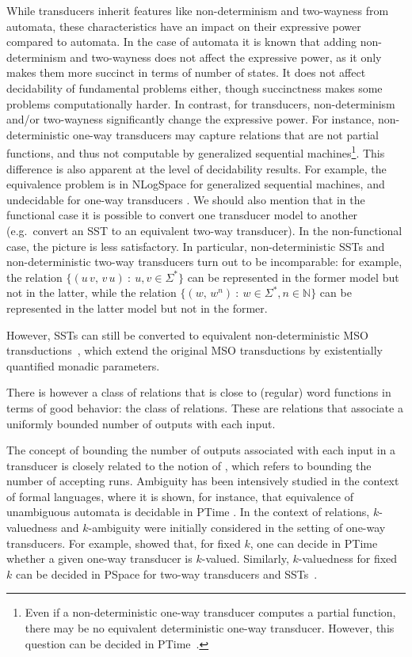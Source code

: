 \documentclass{article}
\providecommand{\AP}{}\NewDocumentCommand{\reintro}{o m}{#2}
\begin{document}
While transducers inherit features like
non-determinism and two-wayness from automata,
these characteristics have an
impact on their expressive power compared to automata. 
In the case of automata it is known that adding non-determinism and 
two-wayness does not affect the expressive power,
as it only makes them more succinct in terms of number of states.
It does not affect decidability of fundamental problems either,
though succinctness makes some problems 
computationally harder. 
In contrast, for transducers, non-determinism 
and/or two-wayness
significantly  change the expressive power.
For instance, non-deterministic one-way transducers may capture 
relations that are not partial functions,
and thus not computable by generalized sequential machines\footnote{Even if a
non-deterministic one-way transducer computes a partial function, there may be
no equivalent deterministic one-way transducer. However, this question can be decided in {\upshape\sc PTime}~\cite{BealC02,AllauzenM03}.}.
This difference is also apparent at the level of decidability results. 
For example, the equivalence problem is in {\upshape\sc NLogSpace}
for generalized sequential machines,
and undecidable for one-way transducers \cite{FischerR68,iba78siam,many_facets}.
We should also mention that in the functional case it is 
possible to convert one transducer model to another
(e.g.~convert an SST to an equivalent two-way transducer).
In the non-functional case, the picture is less satisfactory.
In particular, non-deterministic SSTs and non-deterministic 
two-way transducers turn out to be incomparable:
for example, the relation
$\{(u\,v, \, v\,u) \::\: u,v\in\Sigma^*\}$ can be represented 
in the former model but not in the latter, while the relation
$\{(w, \, w^n) \::\: w\in\Sigma^*, n\in\mathbb{N}\}$ can be
represented in the latter model but not in the former.
\AP
However, SSTs can still be converted to equivalent
non-deterministic MSO transductions~\cite{DBLP:conf/icalp/AlurD11}, 
which extend the original MSO transductions 
by existentially quantified monadic parameters.


\AP
There is however a class of relations that is close
to (regular) word functions in terms of good behavior: 
the class of  relations.
These are relations that associate a uniformly bounded
number of outputs with each input.
\AP
The concept of bounding the number of outputs associated 
with each input in a transducer is closely related to 
the notion of  , which refers to bounding the number of accepting runs.
 Ambiguity has been intensively studied 
in the context of formal languages, where it is shown,
for instance, that equivalence of unambiguous
automata is decidable in {\upshape\sc PTime} \cite{Stearns1985OnTE}.
In the context of relations, $k$-valuedness and $k$-ambiguity
were initially considered in the setting of one-way transducers. 
For example, \cite{GI83} showed that, for fixed $k$,
one can decide in {\upshape\sc PTime} whether a given one-way transducer
is $k$-valued. Similarly, $k$-valuedness for fixed $k$ can be decided
in {\upshape\sc PSpace} for two-way transducers and SSTs~\cite{DBLP:conf/icalp/AlurD11}.
\end{document}
